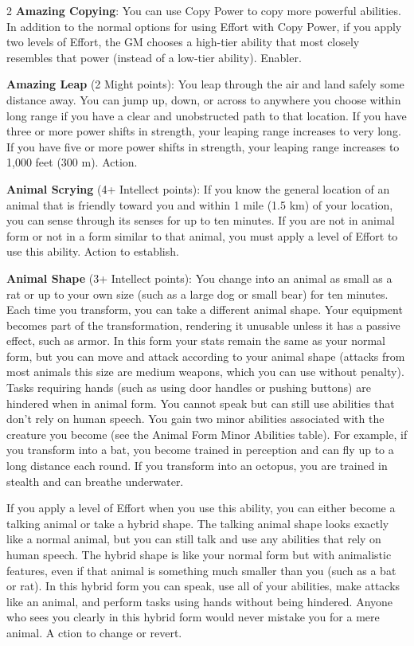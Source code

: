 \begin{multicols}{2}
\textbf{Amazing Copying}: You can use Copy Power to copy more powerful abilities. In addition to the normal options for using Effort with Copy Power, if you apply two levels of Effort, the GM chooses a high-tier ability that most closely resembles that power (instead of a low-tier ability). Enabler.

\textbf{Amazing Leap} (2 Might points): You leap through the air and land safely some distance away. You can jump up, down, or across to anywhere you choose within long range if you have a clear and unobstructed path to that location. If you have three or more power shifts in strength, your leaping range increases to very long. If you have five or more power shifts in strength, your leaping range increases to 1,000 feet (300 m). Action.

\textbf{Animal Scrying} (4+ Intellect points): If you know the general location of an animal that is friendly toward you and within 1 mile (1.5 km) of your location, you can sense through its senses for up to ten minutes. If you are not in animal form or not in a form similar to that animal, you must apply a level of Effort to use this ability. Action to establish.

\textbf{Animal Shape} (3+ Intellect points): You change into an animal as small as a rat or up to your own size (such as a large dog or small bear) for ten minutes. Each time you transform, you can take a different animal shape. Your equipment becomes part of the transformation, rendering it unusable unless it has a passive effect, such as armor. In this form your stats remain the same as your normal form, but you can move and attack according to your animal shape (attacks from most animals this size are medium weapons, which you can use without penalty). Tasks requiring hands (such as using door handles or pushing buttons) are hindered when in animal form. You cannot speak but can still use abilities that don’t rely on human speech. You gain two minor abilities associated with the creature you become (see the Animal Form Minor Abilities table). For example, if you transform into a bat, you become trained in perception and can fly up to a long distance each round. If you transform into an octopus, you are trained in stealth and can breathe underwater.

If you apply a level of Effort when you use this ability, you can either become a talking animal or take a hybrid shape. The talking animal shape looks exactly
like a normal animal, but you can still talk and use any abilities that rely on human speech. The hybrid shape is like your normal form but with animalistic features, even if that animal is something much smaller than you (such as a bat or rat). In this hybrid form you can speak, use all of your abilities, make attacks like an animal, and perform tasks using hands without being hindered. Anyone who sees you clearly in this hybrid form would never mistake you for a mere animal.
A
ction to change or revert.


\end{multicols}
